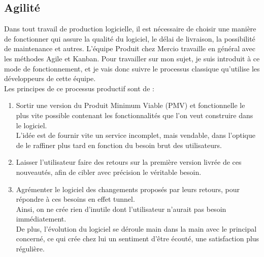 \documentclass{rapportCS}
\begin{document}
\subsection{Agilité}

Dans tout travail de production logicielle, il est nécessaire de choisir une manière de fonctionner
qui assure la qualité du logiciel, le délai de livraison, la possibilité de maintenance et autres. 
L'équipe Produit chez Mercio travaille en général avec les méthodes Agile et Kanban.
Pour travailler sur mon sujet, je suis introduit à ce mode de fonctionnement, et
je vais donc suivre le processus classique qu'utilise les développeurs de cette équipe.\\

Les principes de ce processus productif sont de :
\begin{enumerate}
  \item Sortir une version du Produit Minimum Viable (PMV) et fonctionnelle le plus vite possible contenant
  les fonctionnalités que l'on veut construire dans le logiciel.\\
  L'idée est de fournir vite un service incomplet, mais vendable,
  dans l'optique de le raffiner plus tard en fonction du besoin brut des utilisateurs.
  \item Laisser l'utilisateur faire des retours sur la première version livrée de ces nouveautés,
  afin de cibler avec précision le véritable besoin.
  \item Agrémenter le logiciel des changements proposés par leurs retours, 
  pour répondre à ces besoins en effet tunnel.\\
  Ainsi, on ne crée rien d'inutile dont l'utilisateur n'aurait pas besoin immédiatement.\\
  De plus, l'évolution du logiciel se déroule main dans la main avec le principal concerné, ce qui 
  crée chez lui un sentiment d'être écouté, une satisfaction plus régulière.
  
\end{enumerate}
\end{document}
